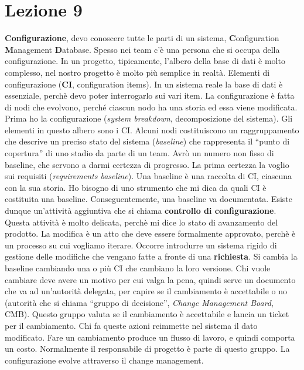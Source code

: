 \section{Lezione 9}

\textbf{Configurazione}, devo conoscere tutte le parti di un sistema, \textbf{C}onfiguration \textbf{M}anagement \textbf{D}atabase. Spesso nei team c'è una persona che si occupa della configurazione. In un progetto, tipicamente, l'albero della base di dati è molto complesso, nel nostro progetto è molto più semplice in realtà. Elementi di configurazione (\textbf{CI}, configuration items). In un sistema reale la base di dati è essenziale, perchè devo poter interrogarlo sui vari item. La configurazione è fatta di nodi che evolvono, perché ciascun nodo ha una storia ed essa viene modificata. Prima ho la configurazione (\textit{system breakdown}, decomposizione del sistema). Gli elementi in questo albero sono i CI. Alcuni nodi costituiscono un raggruppamento che descrive un preciso stato del sistema (\textit{baseline}) che rappresenta il ``punto di copertura'' di uno stadio da parte di un team. Avrò un numero non fisso di baseline, che servono a darmi certezza di progresso. La prima certezza la voglio sui requisiti (\textit{requirements baseline}). Una baseline è una raccolta di CI, ciascuna con la sua storia. Ho bisogno di uno strumento che mi dica da quali CI è costituita una baseline. Conseguentemente, una baseline va documentata. Esiste dunque un'attività aggiuntiva che si chiama \textbf{controllo di configurazione}. Questa attività è molto delicata, perchè mi dice lo stato di avanzamento del prodotto. La modifica è un atto che deve essere formalmente approvato, perchè è un processo su cui vogliamo iterare. Occorre introdurre un sistema rigido di gestione delle modifiche che vengano fatte a fronte di una \textbf{richiesta}. Si cambia la baseline cambiando una o più CI che cambiano la loro versione. Chi vuole cambiare deve avere un motivo per cui valga la pena, quindi serve un documento che va ad un'autorità delegata, per capire se il cambiamento è accettabile o no (autorità che si chiama ``gruppo di decisione'', \textit{Change Management Board}, CMB). Questo gruppo valuta se il cambiamento è accettabile e lancia un ticket per il cambiamento. Chi fa queste azioni reimmette nel sistema il dato modificato. Fare un cambiamento produce un flusso di lavoro, e quindi comporta un costo. Normalmente il responsabile di progetto è parte di questo gruppo. La configurazione evolve attraverso il change management.

